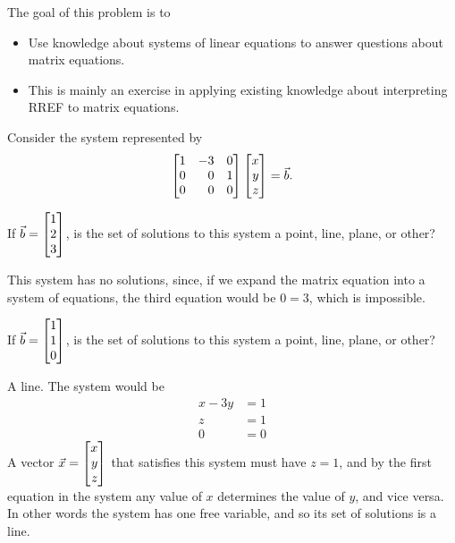 	\bookonlynewpage
	\question
	\begin{annotation}
		\begin{goals}

			The goal of this problem is to
			\begin{itemize}
				\item Use knowledge about systems of linear equations to answer questions
					about matrix equations.
			\end{itemize}
		\end{goals}

		\begin{notes}
			\begin{itemize}
				\item This is mainly an exercise in applying existing knowledge about
					interpreting RREF to matrix equations.
			\end{itemize}
		\end{notes}
	\end{annotation}
	Consider the system represented by
	\[
		\mat{1&-3&0\\0&0&1\\0&0&0}\mat{x\\y\\z}=\vec b.
	\]
	\begin{parts}
		\item If $\vec b=\mat{1\\2\\3}$, is the set of solutions to this system
			a point, line, plane, or other?
			\begin{solution}
				This system has no solutions, since, if we expand the matrix
				equation into a system of equations, the third equation would be
				$0=3$, which is impossible.
			\end{solution}
		\item If $\vec b=\mat{1\\1\\0}$, is the set of solutions to this system
			a point, line, plane, or other?
			\begin{solution}
				A line. The system would be
				\begin{align*}
					x - 3y &= 1 \\
					z &= 1 \\
					0 &= 0
				\end{align*}
				A vector $\vec x=\mat{x\\y\\z}$ that satisfies this system must have
				$z=1$, and by the first equation in the system any value of $x$
				determines the value of $y$, and vice versa. In other words the
				system has one free variable, and so its set of solutions is a line.
			\end{solution}
	\end{parts}

